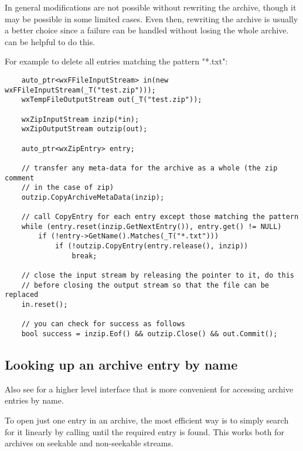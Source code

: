 In general modifications are not possible without rewriting the archive,
though it may be possible in some limited cases. Even then, rewriting the
archive is usually a better choice since a failure can be handled without
losing the whole
archive.  can
be helpful to do this.

For example to delete all entries matching the pattern "*.txt":

\begin{verbatim}
    auto_ptr<wxFFileInputStream> in(new wxFFileInputStream(_T("test.zip")));
    wxTempFileOutputStream out(_T("test.zip"));

    wxZipInputStream inzip(*in);
    wxZipOutputStream outzip(out);

    auto_ptr<wxZipEntry> entry;

    // transfer any meta-data for the archive as a whole (the zip comment
    // in the case of zip)
    outzip.CopyArchiveMetaData(inzip);

    // call CopyEntry for each entry except those matching the pattern
    while (entry.reset(inzip.GetNextEntry()), entry.get() != NULL)
        if (!entry->GetName().Matches(_T("*.txt")))
            if (!outzip.CopyEntry(entry.release(), inzip))
                break;

    // close the input stream by releasing the pointer to it, do this
    // before closing the output stream so that the file can be replaced
    in.reset();

    // you can check for success as follows
    bool success = inzip.Eof() && outzip.Close() && out.Commit();

\end{verbatim}


\subsection{Looking up an archive entry by name}\label{wxarcbyname}


Also see  for a higher level interface that is
more convenient for accessing archive entries by name.

To open just one entry in an archive, the most efficient way is
to simply search for it linearly by calling
  until the
required entry is found. This works both for archives on seekable and
non-seekable streams.

